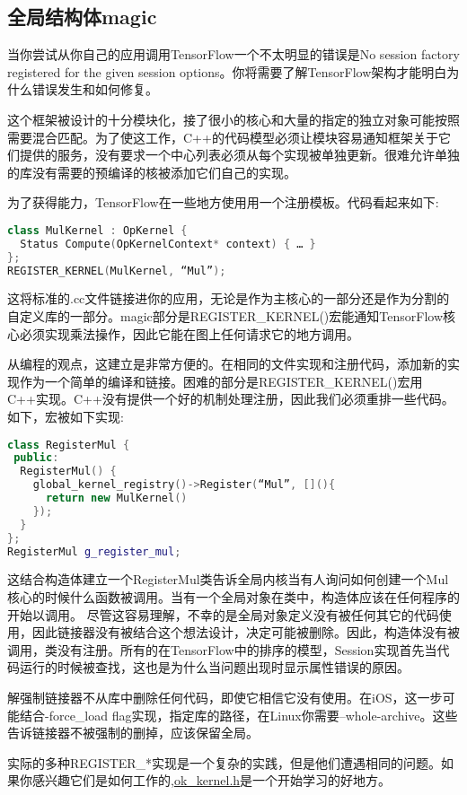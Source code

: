 \subsection{全局结构体magic}
当你尝试从你自己的应用调用TensorFlow一个不太明显的错误是No session factory registered for the given session options。你将需要了解TensorFlow架构才能明白为什么错误发生和如何修复。

这个框架被设计的十分模块化，接了很小的核心和大量的指定的独立对象可能按照需要混合匹配。为了使这工作，C++的代码模型必须让模块容易通知框架关于它们提供的服务，没有要求一个中心列表必须从每个实现被单独更新。很难允许单独的库没有需要的预编译的核被添加它们自己的实现。

为了获得能力，TensorFlow在一些地方使用用一个注册模板。代码看起来如下:
\begin{lstlisting}[language=C++]
class MulKernel : OpKernel {
  Status Compute(OpKernelContext* context) { … }
};
REGISTER_KERNEL(MulKernel, “Mul”);
\end{lstlisting}
这将标准的.cc文件链接进你的应用，无论是作为主核心的一部分还是作为分割的自定义库的一部分。magic部分是REGISTER\_KERNEL()宏能通知TensorFlow核心必须实现乘法操作，因此它能在图上任何请求它的地方调用。

从编程的观点，这建立是非常方便的。在相同的文件实现和注册代码，添加新的实现作为一个简单的编译和链接。困难的部分是REGISTER\_KERNEL()宏用C++实现。C++没有提供一个好的机制处理注册，因此我们必须重排一些代码。如下，宏被如下实现:
\begin{lstlisting}[language=C++]
class RegisterMul {
 public:
  RegisterMul() {
    global_kernel_registry()->Register(“Mul”, [](){
      return new MulKernel()
    });
  }
};
RegisterMul g_register_mul;
\end{lstlisting}
这结合构造体建立一个RegisterMul类告诉全局内核当有人询问如何创建一个Mul核心的时候什么函数被调用。当有一个全局对象在类中，构造体应该在任何程序的开始以调用。
尽管这容易理解，不幸的是全局对象定义没有被任何其它的代码使用，因此链接器没有被结合这个想法设计，决定可能被删除。因此，构造体没有被调用，类没有注册。所有的在TensorFlow中的排序的模型，Session实现首先当代码运行的时候被查找，这也是为什么当问题出现时显示属性错误的原因。

解强制链接器不从库中删除任何代码，即使它相信它没有使用。在iOS，这一步可能结合-force\_load flag实现，指定库的路径，在Linux你需要--whole-archive。这些告诉链接器不被强制的删掉，应该保留全局。

实际的多种REGISTER\_*实现是一个复杂的实践，但是他们遭遇相同的问题。如果你感兴趣它们是如何工作的,\href{https://github.com/tensorflow/tensorflow/blob/master/tensorflow/core/framework/op_kernel.h#L1091}{ok\_kernel.h}是一个开始学习的好地方。
